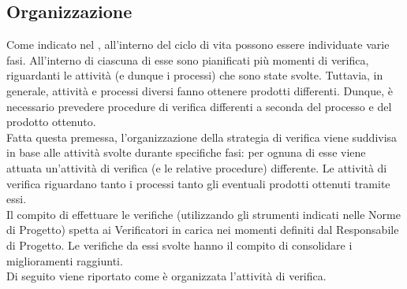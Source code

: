 	\subsection{Organizzazione}
		Come indicato nel , all'interno del ciclo di vita possono essere individuate varie fasi. All'interno di ciascuna di 
		esse sono pianificati più momenti di verifica, riguardanti le attività (e dunque i processi) che sono state svolte. Tuttavia, in generale, attività 
		e processi diversi fanno ottenere prodotti differenti. Dunque, è necessario prevedere procedure di verifica differenti a seconda del processo e del 
		prodotto ottenuto.\\
		Fatta questa premessa, l'organizzazione della strategia di verifica viene suddivisa in base alle attività svolte durante specifiche fasi: per ognuna 
		di esse viene attuata un'attività di verifica (e le relative procedure) differente. Le attività di verifica riguardano tanto i processi tanto gli 
		eventuali prodotti ottenuti tramite essi.\\
		Il compito di effettuare le verifiche (utilizzando gli strumenti indicati nelle Norme di Progetto) spetta ai Verificatori in carica nei momenti 
		definiti dal Responsabile di Progetto. Le verifiche da essi svolte hanno il compito di consolidare i miglioramenti raggiunti.\\
		Di seguito viene riportato come è organizzata l'attività di verifica.
